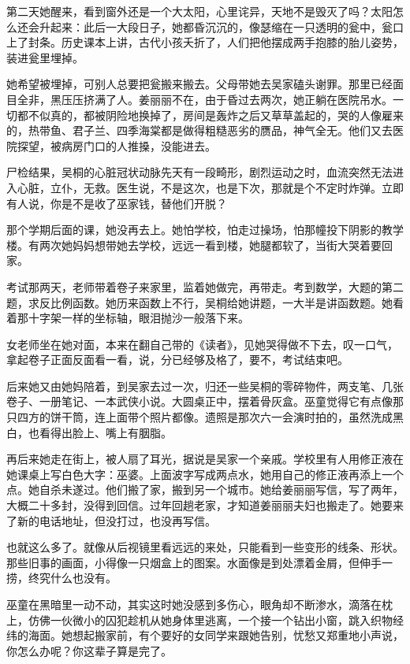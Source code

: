\documentclass[lang=cn,newtx,12pt,scheme=chinese]{elegantbook}
\begin{document}
第二天她醒来，看到窗外还是一个大太阳，心里诧异，天地不是毁灭了吗？太阳怎么还会升起来：此后一大段日子，她都昏沉沉的，像瑟缩在一只透明的瓮中，瓮口上了封条。历史课本上讲，古代小孩夭折了，人们把他摆成两手抱膝的胎儿姿势，装进瓮里埋掉。

她希望被埋掉，可别人总要把瓮搬来搬去。父母带她去吴家磕头谢罪。那里已经面目全非，黑压压挤满了人。姜丽丽不在，由于昏过去两次，她正躺在医院吊水。一切都不似真的，都被阴险地换掉了，房间是轰炸之后又草草盖起的，哭的人像雇来的，热带鱼、君子兰、四季海棠都是做得粗糙恶劣的赝品，神气全无。他们又去医院探望，被病房门口的人推搡，没能进去。

尸检结果，吴桐的心脏冠状动脉先天有一段畸形，剧烈运动之时，血流突然无法进入心脏，立仆，无救。医生说，不是这次，也是下次，那就是个不定时炸弹。立即有人说，你是不是收了巫家钱，替他们开脱？

那个学期后面的课，她没再去上。她怕学校，怕走过操场，怕那幢投下阴影的教学楼。有两次她妈妈想带她去学校，远远一看到楼，她腿都软了，当街大哭着要回家。

考试那两天，老师带着卷子来家里，监着她做完，再带走。考到数学，大题的第二题，求反比例函数。她历来函数上不行，吴桐给她讲题，一大半是讲函数题。她看着那十字架一样的坐标轴，眼泪抛沙一般落下来。

女老师坐在她对面，本来在翻自己带的《读者》，见她哭得做不下去，叹一口气，拿起卷子正面反面看一看，说，分已经够及格了，要不，考试结束吧。

后来她又由她妈陪着，到吴家去过一次，归还一些吴桐的零碎物件，两支笔、几张卷子、一册笔记、一本武侠小说。大圆桌正中，摆着骨灰盒。巫童觉得它有点像那只四方的饼干筒，连上面带个照片都像。遗照是那次六一会演时拍的，虽然洗成黑白，也看得出脸上、嘴上有胭脂。

再后来她走在街上，被人扇了耳光，据说是吴家一个亲戚。学校里有人用修正液在她课桌上写白色大字：巫婆。上面波字写成两点水，她用自己的修正液再添上一个点。她自杀未遂过。他们搬了家，搬到另一个城市。她给姜丽丽写信，写了两年，大概二十多封，没得到回信。过年回趟老家，才知道姜丽丽夫妇也搬走了。她要来了新的电话地址，但没打过，也没再写信。

也就这么多了。就像从后视镜里看远远的来处，只能看到一些变形的线条、形状。那些旧事的画面，小得像一只烟盒上的图案。水面像是到处漂着金屑，但伸手一捞，终究什么也没有。

巫童在黑暗里一动不动，其实这时她没感到多伤心，眼角却不断渗水，滴落在枕上，仿佛一伙微小的囚犯趁机从她身体里逃离，一个接一个钻出小窗，跳入织物经纬的海面。她想起搬家前，有个要好的女同学来跟她告别，忧愁又郑重地小声说，你怎么办呢？你这辈子算是完了。
\end{document}
